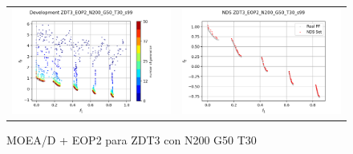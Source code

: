 \begin{figure}[H]
\begin{tabular}{c c}
    \includegraphics[scale=0.5]{figures/ZDT3_EOP2_N200_G50_T30/s99_dev.png} &
    \includegraphics[scale=0.5]{figures/ZDT3_EOP2_N200_G50_T30/s99_nds.png}\\
    \end{tabular}
    \caption{MOEA/D + EOP2 para ZDT3 con N200 G50 T30 }
    \label{fig:6}
\end{figure}

